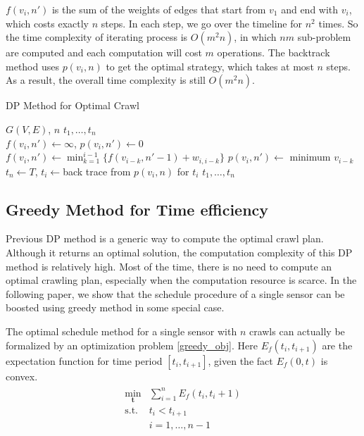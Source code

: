 \documentclass[conference]{IEEEtran}
\begin{document}
$f(v_i,n')$ is the sum of the weights of edges that start from $v_1$ and end with $v_i$, which costs exactly $n$ steps. 
In each step, we go over the timeline for $n^2$ times.
So the time complexity of iterating process is $O(m^2n)$, in which $nm$ sub-problem are computed and each computation will cost $m$ operations. 
The backtrack method uses $p(v_i, n)$ to get the optimal strategy, which takes at most $n$ steps. 
As a result, the overall time complexity is still $O(m^2n)$.
\begin{algorithm}
\caption{DP Method for Optimal Crawl}
\label{alg:dp_min}
\begin{algorithmic}[1]
	\renewcommand{\algorithmicrequire}{\textbf{Input:}}
	\renewcommand{\algorithmicensure}{\textbf{Output:}}
	\REQUIRE $G(V,E)$, $n$
	\ENSURE  $t_1,\ldots,t_n$
	\\
	\STATE $f(v_i,n') \gets \infty$, $p(v_i,n')\gets 0$
	\STATE $f(v_i,n')\gets\min_{k=1}^{i-1}\{f(v_{i-k}, n'-1)+w_{i,i-k}\}$
	\STATE $p(v_i,n')\gets$ minimum $v_{i-k}$
	\ENDFOR
	\ENDFOR
	\STATE $t_n\gets T$, $t_i\gets$back trace from $p(v_i, n)$ for $t_i$
	\RETURN $t_1,\ldots,t_n$
\end{algorithmic}
\end{algorithm}

\subsection{Greedy Method for Time efficiency}

Previous DP method is a generic way to compute the optimal crawl plan. 
Although it returns an optimal solution, the computation complexity of this DP method is relatively high.
Most of the time, there is no need to compute an optimal crawling plan, especially when the computation resource is scarce.
In the following paper, we show that the schedule procedure of a single sensor can be boosted using greedy method in some special case.

The optimal schedule method for a single sensor with $n$ crawls can actually be formalized by an optimization problem \ref{greedy_obj}. 
Here $E_f(t_i,t_{i+1})$ are the expectation function for time period $[t_i, t_{i+1}]$, given the fact $E_f(0,t)$ is convex.
\begin{eqnarray}
\begin{array}{ll}
\min_{\textbf{t}}& \sum_{i=1}^{n} E_f(t_i,t_i+1)\\
\text{s.t.}
& t_i < t_{i+1}\\
& i=1,\ldots,n-1
\end{array}\label{greedy_obj}
\end{eqnarray}
\end{document}
